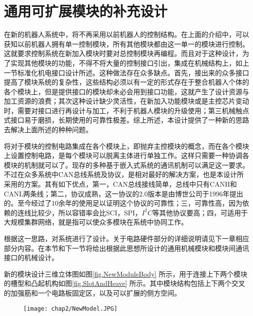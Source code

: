 \section{通用可扩展模块的补充设计}
在新的机器人系统中，将不再采用以前机器人的控制结构。在上面的介绍中，可以获知以前机器人拥有单一控制模块，所有其他模块都由这一单一的模块进行控制。这就要求控制系统在新加入模块时要对总控制模块再编程。而且对于这种设计，为了实现其他模块的功能，不得不将大量的控制接口引出，集成在机械结构上，如上一节标准化机电接口设计所述。这种做法存在众多缺点。首先，接出来的众多接口提高了模块系统的复杂性，这些结构必须以有一定的形式存在于整合机器人个体的各个模块上，但是提供接口的模块却未必会用到接口功能，这就产生了设计资源与加工资源的浪费；其次这种设计缺少灵活性，在新加入功能模块或是主控芯片变动时，需要对接口进行再设计与加工，不利于机器人模块的升级使用；第三机械触点式接口易于磨损，长期使用的可靠性极差。综上所述，本设计提供了一种新的思路去解决上面所述的种种问题。

将对于模块的控制电路集成在各个模块上，即抛弃主控模块的概念，而在各个模块上设置控制电路，是每个模块可以脱离主体进行单独工作。这样只需要一种协调各模块的机制就可以了。现存的多种基于嵌入式系统的通讯机制可以满足这一要求。不过在众多系统中CAN总线系统及协议，是相对最好的解决方案，也是本设计所采用的方案。其有如下优点，第一，CAN总线接线简单，总线中只有CANH和CANL两条线；第二，协议成熟，这一协议的2.0版本是由博世公司于1996年提出的。至今经过了10余年的使用足以证明这个协议的可靠性；三，可靠性高，因为依赖的连线比较少，所以容错率会比SCI，SPI，$I^2C$等其他协议要高；四，可适用于大规模集群网络，就是指可以使众多模块在系统中协同工作。

根据这一思路，对系统进行了设计。关于电路硬件部分的详细说明请见下一章相应部分内容。在本节和下一节将给出根据此思想所设计的通用机械模块和模块间通讯接口的机械设计。

新的模块设计三维立体图如图\ref{fig.NewModuleBody} 所示，用于连接上下两个模块的槽型和凸起机构如图\ref{fig.SlotAndHeave} 所示。其中模块结构包括上下两个交叉的加强筋和一个电路板固定区，以及可以扩展的侧方空间。
\begin{figure}[!htp]
  \centering
  \texttt{[image: chap2/NewModel.JPG]}
\end{figure}
\begin{figure}
  \centering
\end{figure}
